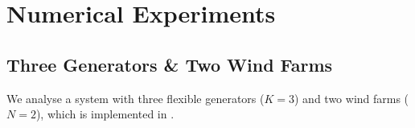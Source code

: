\documentclass{article}
\newtheorem{proposition}{Proposition}
\begin{document}


\section{Numerical Experiments}

\subsection{Three Generators \& Two Wind Farms}

We analyse a system with three flexible generators ($K = 3$) and two wind farms ($N = 2$), which is implemented in \cite{SMER2022}. 
\end{document}
